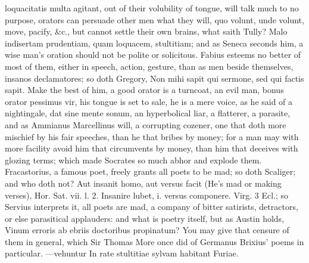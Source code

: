 {loquacitatis multa agitant, out of their volubility of tongue, will
talk much to no purpose, orators can persuade other men what they will,
quo volunt, unde volunt, move, pacify, \&c., but cannot settle their own
brains, what saith Tully? Malo indisertam prudentiam, quam loquacem,
stultitiam; and as Seneca seconds him, a wise man's oration should
not be polite or solicitous. Fabius esteems no better of most of
them, either in speech, action, gesture, than as men beside themselves,
insanos declamatores; so doth Gregory, Non mihi sapit qui sermone, sed
qui factis sapit. Make the best of him, a good orator is a turncoat, an
evil man, bonus orator pessimus vir, his tongue is set to sale, he is a
mere voice, as he said of a nightingale, dat sine mente sonum, an
hyperbolical liar, a flatterer, a parasite, and as  Ammianus
Marcellinus will, a corrupting cozener, one that doth more mischief by
his fair speeches, than he that bribes by money; for a man may with
more facility avoid him that circumvents by money, than him that
deceives with glozing terms; which made Socrates so much abhor and
explode them. Fracastorius, a famous poet, freely grants all poets
to be mad; so doth Scaliger; and who doth not? Aut insanit homo,
aut versus facit (He's mad or making verses), Hor. Sat. vii. l. 2.
Insanire lubet, i. versus componere. Virg. 3 Ecl.; so Servius
interprets it, all poets are mad, a company of bitter satirists,
detractors, or else parasitical applauders: and what is poetry itself,
but as Austin holds, Vinum erroris ab ebriis doctoribus propinatum? You
may give that censure of them in general, which Sir Thomas More once
did of Germanus Brixius' poems in particular.
---vehuntur
In rate stultitiae sylvam habitant Furiae.

}
